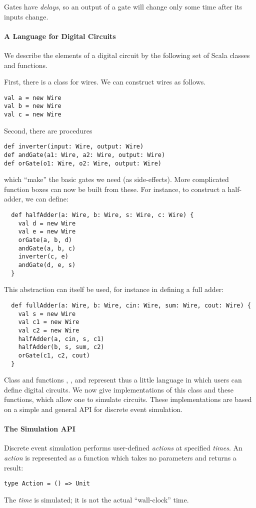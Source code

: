 Gates have {\em delays}, so an output of a gate will change only some
time after its inputs change.

\paragraph{A Language for Digital Circuits}

We describe the elements of a digital circuit by the following set of
Scala classes and functions.

First, there is a class  for wires.
We can construct wires as follows.
\begin{lstlisting}
val a = new Wire
val b = new Wire
val c = new Wire
\end{lstlisting}
Second, there are procedures
\begin{lstlisting}
def inverter(input: Wire, output: Wire)
def andGate(a1: Wire, a2: Wire, output: Wire)
def orGate(o1: Wire, o2: Wire, output: Wire)
\end{lstlisting}
which ``make'' the basic gates we need (as side-effects).
More complicated function boxes can now be built from these.
For instance, to construct a half-adder, we can define:
\begin{lstlisting}
  def halfAdder(a: Wire, b: Wire, s: Wire, c: Wire) {
    val d = new Wire
    val e = new Wire
    orGate(a, b, d)
    andGate(a, b, c)
    inverter(c, e)
    andGate(d, e, s)
  }
\end{lstlisting}
This abstraction can itself be used, for instance in defining a full
adder:
\begin{lstlisting}
  def fullAdder(a: Wire, b: Wire, cin: Wire, sum: Wire, cout: Wire) {
    val s = new Wire
    val c1 = new Wire
    val c2 = new Wire
    halfAdder(a, cin, s, c1)
    halfAdder(b, s, sum, c2)
    orGate(c1, c2, cout)
  }
\end{lstlisting}
Class  and functions , , and
 represent thus a little language in which users can
define digital circuits.  We now give implementations of this class
and these functions, which allow one to simulate circuits.
These implementations are based on a simple and general API for
discrete event simulation.

\paragraph{The Simulation API}

Discrete event simulation performs user-defined \emph{actions} at
specified \emph{times}.  
An {\em action} is represented as a function which takes no parameters and
returns a  result:
\begin{lstlisting}
type Action = () => Unit
\end{lstlisting}
The \emph{time} is simulated; it is not the actual ``wall-clock'' time.

